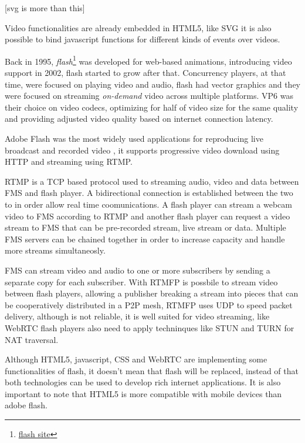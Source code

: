 {\color{red} [svg is more than this]}

  Video functionalities are already embedded in \ac{HTML}5, like \ac{SVG} it is also possible to bind javascript functions for different kinds of events over videos.

  Back in 1995, \textit{flash}\footnote{\url{flash site}} was developed for web-based animations, introducing video support in 2002, flash started to grow after that. Concurrency players, at that time, were focused on playing video and audio, flash had vector graphics and they were focused on streaming \textit{on-demand} video across multiple platforms. VP6 was their choice on video codecs, optimizing for half of video size for the same quality and providing adjusted video quality based on internet connection latency. 

  Adobe Flash was the most widely used applications for reproducing live broadcast and recorded video \cite{flashvideo}, it supports progressive video download using \ac{HTTP} and streaming using \ac{RTMP}. 

  \ac{RTMP} is a \ac{TCP} based protocol used to streaming audio, video and data between \ac{FMS} and flash player. A bidirectional connection is established between the two to in order allow real time coomunications. A flash player can stream a webcam video to \ac{FMS} according to \ac{RTMP} and another flash player can request a video stream to \ac{FMS} that can be pre-recorded stream, live stream or data. Multiple \ac{FMS} servers can be chained together in order to increase capacity and handle more streams simultaneosly.

  \ac{FMS} can stream video and audio to one or more subscribers by sending a separate copy for each subscriber. With \ac{RTMFP} is possbile to stream video between flash players, allowing a publisher breaking a stream into pieces that can be cooperatively distributed in a P2P mesh, \ac{RTMFP} uses \ac{UDP} to speed packet delivery, although is not reliable, it is well suited for video streaming, like \ac{WebRTC} flash players also need to apply techninques like \ac{STUN} and \ac{TURN} for \ac{NAT} traversal.

  Although \ac{HTML}5, javascript, \ac{CSS} and \ac{WebRTC} are implementing some functionalities of flash, it doesn't mean that flash will be replaced, instead of that both technologies can be used to develop rich internet applications. It is also important to note that \ac{HTML}5 is more compatible with mobile devices than adobe flash. 

